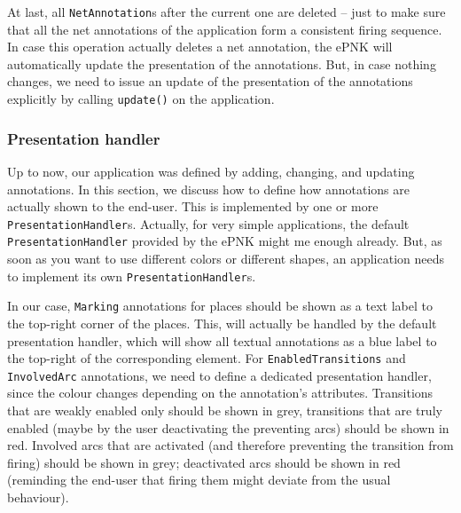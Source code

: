 At last, all {\tt NetAnnotation}s after the current one are deleted -- just to
make sure that all the net annotations of the application form a consistent
firing sequence. In case this operation actually deletes a net annotation, the
ePNK will automatically update the presentation of the annotations. But, in case
nothing changes, we need to issue an update of the presentation of the
annotations explicitly by calling {\tt update()} on the application.

\subsubsection{Presentation handler}
\label{subsubsec:tutorial:technical:application:presentationhandler}

Up to now, our application was defined by adding, changing, and updating
annotations. In this section, we discuss how to define how annotations are
actually shown to the end-user. This is implemented by one or more {\tt
PresentationHandler}s. Actually, for very simple applications, the default
{\tt PresentationHandler} provided by the ePNK might me enough already. But,
as soon as you want to use different colors or different shapes, an application
needs to implement its own {\tt PresentationHandler}s.

In our case, {\tt Marking} annotations for places should
be shown as a text label to the top-right corner of the places. This, will
actually be handled by the default presentation handler, which will show all
textual annotations as a blue label to the top-right of the corresponding
element. For {\tt EnabledTransitions} and {\tt InvolvedArc} annotations, we
need to define a dedicated presentation handler, since the colour changes
depending on the annotation's attributes. Transitions that are weakly enabled
only should be shown in grey, transitions that are truly enabled (maybe by the
user deactivating the preventing arcs) should be shown in red. Involved arcs
that are activated (and therefore preventing the transition from firing) should
be shown in grey; deactivated arcs should be shown in red (reminding the
end-user that firing them might deviate from the usual behaviour).

